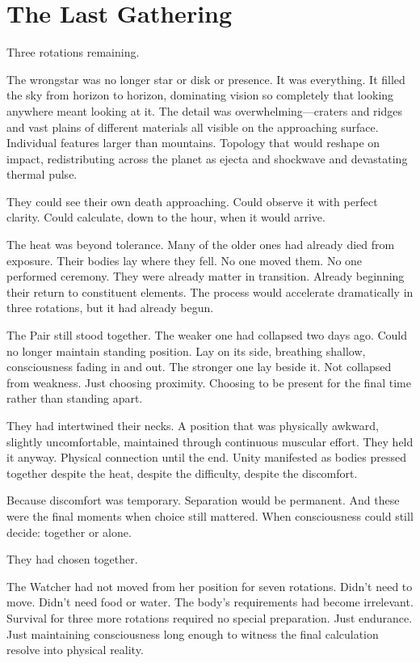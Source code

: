 \chapter{The Last Gathering}
\label{ch:14}


Three rotations remaining.

The wrongstar was no longer star or disk or presence. It was everything. It filled the sky from horizon to horizon, dominating vision so completely that looking anywhere meant looking at it. The detail was overwhelming—craters and ridges and vast plains of different materials all visible on the approaching surface. Individual features larger than mountains. Topology that would reshape on impact, redistributing across the planet as ejecta and shockwave and devastating thermal pulse.

They could see their own death approaching. Could observe it with perfect clarity. Could calculate, down to the hour, when it would arrive.

The heat was beyond tolerance. Many of the older ones had already died from exposure. Their bodies lay where they fell. No one moved them. No one performed ceremony. They were already matter in transition. Already beginning their return to constituent elements. The process would accelerate dramatically in three rotations, but it had already begun.

The Pair still stood together. The weaker one had collapsed two days ago. Could no longer maintain standing position. Lay on its side, breathing shallow, consciousness fading in and out. The stronger one lay beside it. Not collapsed from weakness. Just choosing proximity. Choosing to be present for the final time rather than standing apart.

They had intertwined their necks. A position that was physically awkward, slightly uncomfortable, maintained through continuous muscular effort. They held it anyway. Physical connection until the end. Unity manifested as bodies pressed together despite the heat, despite the difficulty, despite the discomfort.

Because discomfort was temporary. Separation would be permanent. And these were the final moments when choice still mattered. When consciousness could still decide: together or alone.

They had chosen together.

\scenebreak

The Watcher had not moved from her position for seven rotations. Didn't need to move. Didn't need food or water. The body's requirements had become irrelevant. Survival for three more rotations required no special preparation. Just endurance. Just maintaining consciousness long enough to witness the final calculation resolve into physical reality.

